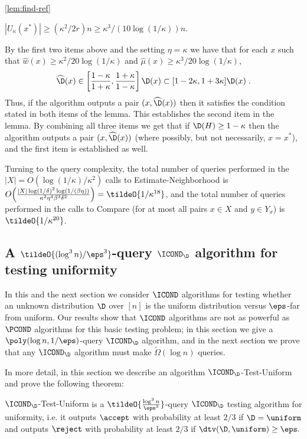 \begin{proofof}{\cref{lem:find-ref}}
\begin{enumerate}
$|U_\kappa(x^\ast)| \geq (\kappa^2/2r)n \geq \kappa^3/(10\log(1/\kappa))n$.
\end{enumerate}
By the first two items above and the setting $\eta = \kappa$ we have that
for each $x$ such that $\hat{w}(x) \geq \kappa^2/20\log(1/\kappa)$ and
$\hat{\mu}(x) \geq \kappa^3/20\log(1/\kappa)$,
$$\widehat{\D}(x) \in
  \left[\frac{1-\kappa}{1+\kappa},\frac{1+\kappa}{1-\kappa}\right]\D(x)
     \subset [1-2\kappa,1+3\kappa]\D(x)\;.$$
Thus, if the algorithm outputs a pair $(x,\widehat{\D}(x))$
then it satisfies the condition stated in both items of the lemma.
This establishes the second item in the lemma.
By combining all three items we get that if $\D(H) \geq 1-\kappa$
then the algorithm outputs a pair $(x,\widehat{\D}(x))$
(where possibly, but not necessarily, $x = x^\ast$), and the first
item is established as well.

Turning to the query complexity, the total number of \PCOND queries performed
in the \mbox{$|X| = O(\log(1/\kappa)/\kappa^2)$}
calls to {\sc Estimate-Neighborhood}  is
$O\!\left(\frac{|X|\log(1/\delta)^2\log(1/(\beta\eta))}
            {\kappa^2\eta^4 \beta^3\delta^2}\right)
            = \tildeO{ 1/\kappa^{18} }$, and
the total number of \PCOND queries performed in the
calls to {\sc Compare} (for at most all pairs $x\in X$ and $y \in Y_x$)
is $\tildeO{ 1/\kappa^{20} }$. 
\end{proofof}
\subsection{A \texorpdfstring{$\tildeO{ ({\log^3 n})/{\eps^3} }$}{\~O(log\^{}3 n/eps\^{}3)}-query \texorpdfstring{$\ICOND_\D$}{\ICOND} algorithm for testing uniformity}
\label{ssec:unif-alg:icond}

In this and the next section we consider $\ICOND$ algorithms for testing
whether an unknown distribution $\D$ over $[n]$ is the uniform distribution
versus $\eps$-far from uniform.
Our results show that $\ICOND$ algorithms are not as powerful as
$\PCOND$ algorithms for this basic testing problem; in this section we give a $\poly(\log n, 1/\eps)$-query $\ICOND_\D$ algorithm, and
in the next section we prove that any $\ICOND_\D$ algorithm must make $\tilde{\Omega}(\log n)$ queries.

In more detail, in this section we describe an algorithm {\sc
$\ICOND_\D$-Test-Uniform} and prove the following theorem:

\begin{theorem} \label{thm:intcond-test-uniform} {\sc $\ICOND_\D$-Test-Uniform} is a
$\tildeO{ \frac{\log^3 n}{\eps^3} }$-query $\ICOND_\D$ testing algorithm
for uniformity, i.e. it outputs $\accept$ with probability at least
$2/3$ if $\D = \uniform$ and outputs $\reject$ with probability at
least $2/3$ if $\dtv(\D,\uniform) \geq \eps.$ \end{theorem}

